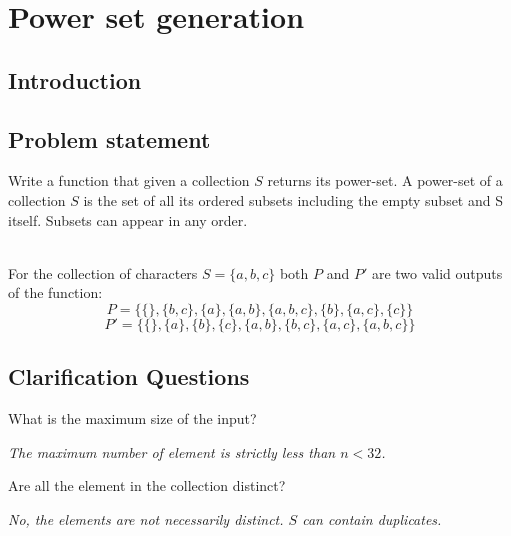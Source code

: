 %


\chapter{Power set generation}
\label{ch:power_set}
\section*{Introduction}


\section{Problem statement}
Write a function that given a collection $S$ returns its power-set. A power-set of a collection $S$ is the set of all its ordered subsets including the empty subset and S itself. Subsets can appear in any order.

\begin{example}
	\hfill \\
	For the collection of characters $S=\{a,b,c\}$  both $P$ and $P'$ are two valid outputs of the function:
	\begin{equation*}
		P = \{\{\}, \{b,c\}, \{a\}, \{a,b\}, \{a,b,c\}, \{b\}, \{a,c\}, \{c\} \}
	\end{equation*}
	\begin{equation*}
		P' = \{\{\}, \{a\}, \{b\}, \{c\}, \{a,b\}, \{b,c\}, \{a,c\}, \{a,b,c\} \}
	\end{equation*}
	
\end{example}

\section{Clarification Questions}

\begin{QandA}
	\item What is the maximum size of the input?
	\begin{answered}
		\textit{The maximum number of element is strictly less than $n < 32$.}
	\end{answered}
	
	\item Are all the element in the collection distinct?
	\begin{answered}
		\textit{No, the elements are not necessarily distinct. $S$ can contain duplicates.
}
	\end{answered}
\end{QandA}

